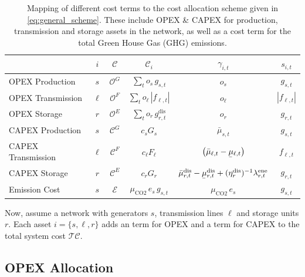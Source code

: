 \documentclass[11pt,twocolumn]{article}
\newcommand{\ubar}[1]{\underaccent{\bar}{#1}}
\newcommand{\state}{s_{i,t}}
\newcommand{\costfactor}{\gamma_{i,t}}
\newcommand{\generation}{g_{s,t}}
\newcommand{\capacitygeneration}{G_{s}}
\newcommand{\operationalpricegeneration}{o_{s}}
\newcommand{\capitalpricegeneration}{c_{s}}
\newcommand{\muuppergeneration}{\bar{\mu}_{s,t}}
\newcommand{\flow}{f_{\ell,t}}
\newcommand{\capacityflow}{F_{\ell}}
\newcommand{\operationalpriceflow}{o_\ell}
\newcommand{\capitalpriceflow}{c_{\ell}}
\newcommand{\mulowerflow}{\ubar{\mu}_{\ell,t}}
\newcommand{\muupperflow}{\bar{\mu}_{\ell,t}}
\newcommand{\storage}{g_{r,t}}
\newcommand{\storagedispatch}{\storage^\text{dis}}
\newcommand{\efficiency}{\eta_{r}}
\newcommand{\efficiencydispatch}{\efficiency^\text{dis}}
\newcommand{\operationalpricestorage}{o_r}
\newcommand{\capitalpricestorage}{c_r}
\newcommand{\capacitystorage}{G_r}
\newcommand{\mulowerstoragedispatch}{\ubar{\mu}_{r,t}^\text{dis}}
\newcommand{\muupperstoragedispatch}{\bar{\mu}_{r,t}^\text{dis}}
\newcommand{\mustateofcharge}{\lambda^\text{ene}_{r,t}}
\newcommand{\emission}{e_{s}}
\newcommand{\emissionprice}{\mu_{\text{CO2}}}
\newcommand{\totalcost}{\mathcal{TC}}
\newcommand{\cost}{\mathcal{C}}
\newcommand{\opexgeneration}{\mathcal{O}^G}
\newcommand{\opexflow}{\mathcal{O}^F}
\newcommand{\opexstorage}{\mathcal{O}^E}
\newcommand{\capexgeneration}{\mathcal{C}^G}
\newcommand{\capexflow}{\mathcal{C}^F}
\newcommand{\capexstorage}{\mathcal{C}^E}
\newcommand{\emissioncost}{\mathcal{E}}
\begin{document}
\begin{table}[t]
    \begin{center}
        \begin{tabular}{l|c|c|c|c|c}
        & $i$ & $\cost$ & $\cost_i$  & $\costfactor$ & $\state$  \\
        \toprule 
        OPEX Production & $s$ & $\opexgeneration$ & $\sum_{t} \operationalpricegeneration \, \generation$   & $\operationalpricegeneration$ & $\generation$ \\  
        OPEX Transmission  & $\ell$ & $\opexflow$ & $\sum_{t} \operationalpriceflow \, |\flow|  $ & $\operationalpriceflow$ & $|\flow|$ \\  
        OPEX Storage & $r$  & $\opexstorage$ & $\sum_{t} \operationalpricestorage \, \storagedispatch$ &  $\operationalpricestorage$ & $\storage$ \\
        \midrule   
        CAPEX Production & $s$ & $\capexgeneration$ & $ \capitalpricegeneration \capacitygeneration$ & $\muuppergeneration$ & $\generation$ \\
        CAPEX Transmission & $\ell$ & $\capexflow$ & $ \capitalpriceflow \capacityflow$ & $\left(\muupperflow - \mulowerflow \right)$ & $\flow$ \\
        CAPEX Storage & $r$ & $\capexstorage$ & $ \capitalpricestorage \capacitystorage$ & $ \muupperstoragedispatch - \mulowerstoragedispatch  + (\efficiencydispatch )^{-1} \mustateofcharge $ & $\storage$ \\
        \midrule
        Emission Cost & $s$ & $\emissioncost$ & $ \emissionprice \, \emission \, \generation$ & $\emissionprice \,\emission$ & $\generation$ \\
    \end{tabular}
    \end{center}
    \caption{Mapping of different cost terms to the cost allocation scheme given in \cref{eq:general_scheme}. These include OPEX \& CAPEX for production, transmission and storage assets in the network, as well as a cost term for the total Green House Gas (GHG) emissions.}
    \label{tab:cost_allocation_map}
\end{table}
    
Now, assume a network with generators $s$, transmission lines $\ell$ and storage units $r$. Each asset $i = \{s, \ell, r\}$ adds an term for OPEX and a term for CAPEX to the total system cost $\totalcost$.

\subsection{OPEX Allocation}
\end{document}
